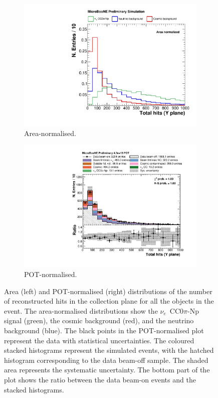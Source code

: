 \begin{figure}[htbp]
\centering
  \begin{subfigure}{0.49\textwidth}
    \includegraphics[width=\linewidth]{figures/h_total_hits_y_norm.pdf}
    \caption{Area-normalised.} \label{fig:nhits_integral}
  \end{subfigure}
    \begin{subfigure}{0.49\textwidth}
    \includegraphics[width=\linewidth]{figures/h_total_hits_y.pdf}
    \caption{POT-normalised.} \label{fig:nhits_pot}
  \end{subfigure}
  \caption{Area (left) and POT-normalised (right) distributions of the number of reconstructed hits in the collection plane for all the objects in the event. The area-normalised distributions show the $\nu_e$~CC0$\pi$-Np signal (green), the cosmic background (red), and the neutrino background (blue). The black points in the POT-normalised plot represent the data with statistical uncertainties. The coloured stacked histograms represent the simulated events, with the hatched histogram corresponding to the data beam-off sample. The shaded area represents the systematic uncertainty. The bottom part of the plot shows the ratio between the data beam-on events and the stacked histograms.}
\end{figure}


